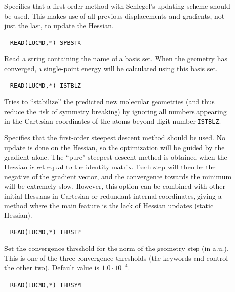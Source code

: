 \begin{description}
\item[]
Specifies that a first-order method
with Schlegel's updating scheme
\cite{Schlegel} should be used. This makes use of all previous
displacements and gradients, not just the last, to update the
Hessian.

\item[]\verb| |
\newline
\verb|READ(LUCMD,*) SPBSTX|

Read a string containing the name of a basis set. When the geometry
has converged, a single-point energy will be calculated using this
basis set.

\item[]\verb| |
\newline
\verb|READ(LUCMD,*) ISTBLZ|

Tries to ``stabilize'' the predicted new molecular geometries (and
thus reduce the risk of symmetry breaking) by ignoring all numbers
appearing in the Cartesian coordinates of the atoms beyond digit
number \verb|ISTBLZ|.

\item[]
Specifies that the first-order steepest descent
 method should be used.
No update is done on the Hessian, so the optimization will be
guided by the gradient alone. The ``pure'' steepest descent method is
obtained when the Hessian is set equal to the identity matrix. Each
step will then be the negative of the gradient vector, and the
convergence towards the minimum will be extremely slow. However, this
option can be combined with other initial Hessians in Cartesian or
redundant internal coordinates,
giving a method where the main feature is the lack of Hessian updates (static Hessian).

\item[]\verb| |
\newline
\verb|READ(LUCMD,*) THRSTP|

Set the convergence threshold for
the norm of the geometry step (in a.u.).
This is one of the three convergence thresholds (the keywords  and
 control the other two). Default value is $1.0\cdot
10^{-4}$.

\item[]\verb| |
\newline
\verb|READ(LUCMD,*) THRSYM|


\end{description}
